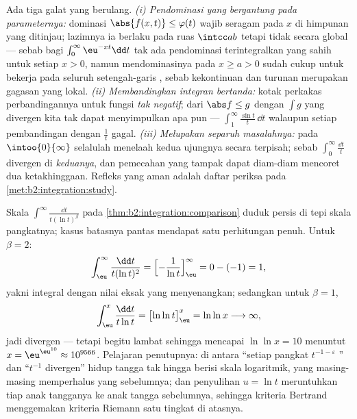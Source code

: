 \begin{remark}
Ada tiga galat yang berulang. \emph{(i) Pendominasi yang bergantung
pada parameternya:} dominasi $\abs{f(x,t)} \leq \varphi(t)$ wajib
seragam pada $x$ di himpunan yang ditinjau; lazimnya ia berlaku pada
ruas $\intcc ab$ tetapi tidak secara global --- sebab bagi
$\int_0^\infty\eu^{-xt}\dd t$ tak ada pendominasi terintegralkan yang
sahih untuk setiap $x > 0$, namun mendominasinya pada $x \geq a > 0$
sudah cukup untuk bekerja pada seluruh setengah-garis , sebab
kekontinuan dan turunan merupakan gagasan yang lokal. \emph{(ii)
Membandingkan integran bertanda:} kotak perkakas perbandingannya untuk
fungsi \emph{tak negatif}; dari $\abs f \leq g$ dengan $\int g$ yang
divergen kita tak dapat menyimpulkan apa pun ---
$\int_1^\infty\frac{\sin t}t\,\dd t$  walaupun setiap
pembandingan dengan $\frac1t$ gagal. \emph{(iii) Melupakan separuh
masalahnya:} pada $\intoo{0}{\infty}$ selalulah menelaah kedua ujungnya
secara terpisah; sebab $\int_0^\infty\frac{\dd t}{t}$ divergen di
\emph{keduanya}, dan pemecahan yang tampak  dapat diam-diam
mencoret dua ketakhinggaan. Refleks yang aman adalah daftar periksa pada
\cref{met:b2:integration:study}.
\end{remark}

\begin{example}\label{ex:b2:integration:bertrandboundary}
Skala $\int^\infty\frac{\dd t}{t(\ln t)^\beta}$ pada
\cref{thm:b2:integration:comparison} duduk persis di tepi
skala pangkatnya; kasus batasnya pantas mendapat satu
perhitungan penuh. Untuk $\beta = 2$:
\[
\int_\eu^{\infty}\frac{\dd t}{t(\ln t)^2}
= \Bigl[-\frac{1}{\ln t}\Bigr]_\eu^{\infty}
= 0 - (-1) = 1 ,
\]
yakni integral  dengan nilai eksak yang menyenangkan;
sedangkan untuk $\beta = 1$,
\[
\int_\eu^{x}\frac{\dd t}{t\ln t}
= \bigl[\ln\ln t\bigr]_\eu^{x} = \ln\ln x
\longrightarrow \infty ,
\]
jadi divergen --- tetapi begitu lambat sehingga mencapai $\ln\ln x = 10$
menuntut $x = \eu^{\eu^{10}} \approx 10^{9566}$. Pelajaran
penutupnya: di antara ``setiap pangkat $t^{-1-\varepsilon}$
'' dan ``$t^{-1}$ divergen'' hidup tangga tak hingga
berisi skala logaritmik, yang masing-masing memperhalus yang
sebelumnya; dan penyulihan $u = \ln t$ meruntuhkan tiap anak tangganya
ke anak tangga sebelumnya, sehingga kriteria Bertrand menggemakan
kriteria Riemann satu tingkat di atasnya.
\end{example}

